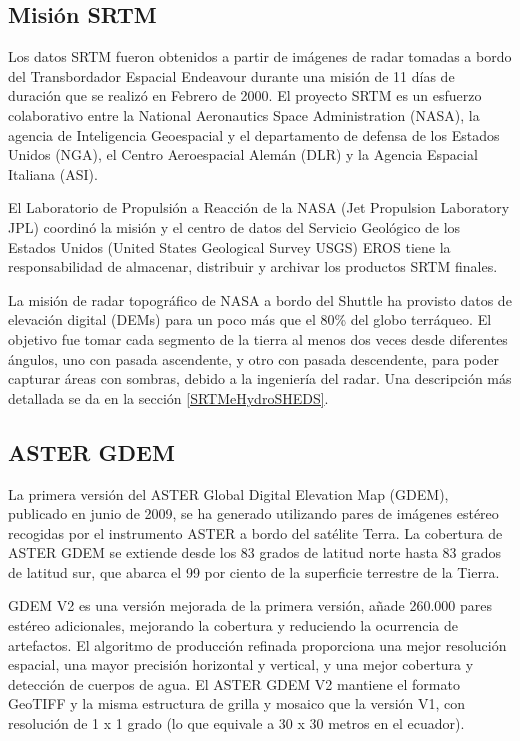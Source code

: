 \documentclass[10pt,a4paper, twoside]{report}
\begin{document}
\subsection{Misión SRTM}

Los datos SRTM fueron obtenidos a partir de imágenes de radar tomadas a bordo del Transbordador Espacial Endeavour durante una misión de 11 días de duración que se realizó en Febrero de 2000. El proyecto SRTM es un esfuerzo colaborativo entre la National Aeronautics Space Administration (NASA), la agencia de Inteligencia Geoespacial y el departamento de defensa de los Estados Unidos (NGA), el Centro Aeroespacial Alemán (DLR) y la Agencia Espacial Italiana (ASI). 

El Laboratorio de Propulsión a Reacción de la NASA (Jet Propulsion Laboratory JPL) coordinó la misión y el centro de datos del Servicio Geológico de los Estados Unidos (United States Geological Survey USGS) EROS tiene la responsabilidad de almacenar, distribuir y archivar los productos SRTM finales.

La misión de radar topográfico de NASA a bordo del Shuttle ha provisto datos de elevación digital (DEMs) para un poco más que el 80\% del globo terráqueo. El objetivo fue tomar cada segmento de la tierra al menos dos veces desde diferentes ángulos, uno con pasada ascendente, y otro con pasada descendente, para poder capturar áreas con sombras, debido a la ingeniería del radar. Una descripción más detallada se da en la sección \ref{SRTMeHydroSHEDS}.


\subsection{ASTER GDEM}

La primera versión del ASTER Global Digital Elevation Map (GDEM), publicado en junio de 2009, se ha generado utilizando pares de imágenes estéreo recogidas por el instrumento ASTER a bordo del satélite Terra. La cobertura de ASTER GDEM se extiende desde los 83 grados de latitud norte hasta 83 grados de latitud sur, que abarca el 99 por ciento de la superficie terrestre de la Tierra.

GDEM V2 es una versión mejorada de la primera versión, añade 260.000 pares estéreo adicionales, mejorando la cobertura y reduciendo la ocurrencia de artefactos. El algoritmo de producción refinada proporciona una mejor resolución espacial, una mayor precisión horizontal y vertical, y una mejor cobertura y detección de cuerpos de agua. El ASTER GDEM V2 mantiene el formato GeoTIFF y la misma estructura de grilla y mosaico que la versión V1, con resolución de 1 x 1 grado (lo que equivale a 30 x 30 metros en el ecuador).
\end{document}
